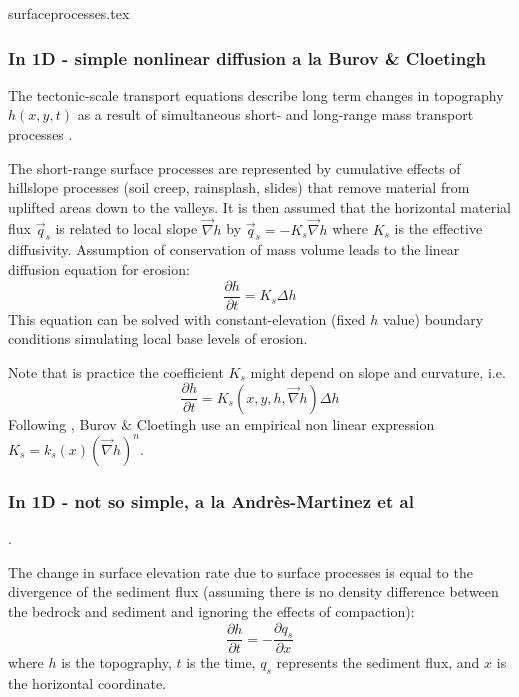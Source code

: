 \begin{flushright} {\tiny {\color{gray} surfaceprocesses.tex}} \end{flushright}

\subsubsection{In 1D - simple nonlinear diffusion a la Burov \& Cloetingh \cite{bucl97}}

The tectonic-scale transport equations describe long term changes
in topography $h(x,y,t)$ as a result of simultaneous short- and long-range
mass transport processes \cite{befh92,kobe94}.

The short-range surface processes are represented by cumulative effects of hillslope 
processes (soil creep, rainsplash, slides) that remove material from uplifted areas 
down to the valleys. 
It is then assumed that the horizontal material flux $\vec{q}_s$ is related to 
local slope $\vec\nabla h$ by $\vec{q}_s=-K_s \vec{\nabla}h$ 
where $K_s$ is the effective diffusivity. Assumption of conservation of mass 
volume leads to the linear diffusion equation for erosion:
\[
\frac{\partial h}{\partial t} = K_s \Delta h
\]
This equation can be solved with constant-elevation (fixed $h$ value)
boundary conditions simulating local base levels of erosion. 

Note that is practice the coefficient $K_s$ might depend on slope and curvature, 
i.e.
\[
\frac{\partial h}{\partial t} = K_s(x,y,h,\vec\nabla h)\Delta h
\]
Following \cite{goss76}, Burov \& Cloetingh use an empirical non linear 
expression $K_s=k_s(x) (\vec\nabla h)^n$. 




\subsubsection{In 1D - not so simple, a la Andr\`es-Martinez et al\cite{anpa19}}. 

The change in surface elevation rate due to surface processes is equal
to the divergence of the sediment flux 
(assuming there is no density difference between the bedrock and
sediment and ignoring the effects of compaction):
\[
\frac{\partial h}{\partial t} = -\frac{\partial q_s}{\partial x}
\]
where $h$ is the topography, $t$ is the time, $q_s$ represents the sediment flux, 
and $x$ is the horizontal coordinate. 

